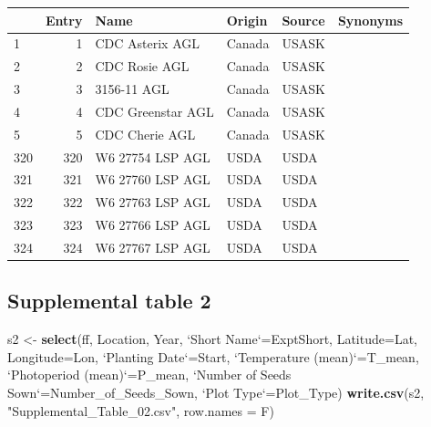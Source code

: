 \documentclass[
]{article}
\newenvironment{Shaded}{\begin{snugshade}}{\end{snugshade}}
\newcommand{\DataTypeTok}[1]{\textcolor[rgb]{0.13,0.29,0.53}{#1}}
\newcommand{\KeywordTok}[1]{\textcolor[rgb]{0.13,0.29,0.53}{\textbf{#1}}}
\newcommand{\NormalTok}[1]{#1}
\newcommand{\StringTok}[1]{\textcolor[rgb]{0.31,0.60,0.02}{#1}}
\begin{document}
\begin{longtable}[]{@{}lrllll@{}}
\toprule
& Entry & Name & Origin & Source & Synonyms\tabularnewline
\midrule
\endhead
1 & 1 & CDC Asterix AGL & Canada & USASK &\tabularnewline
2 & 2 & CDC Rosie AGL & Canada & USASK &\tabularnewline
3 & 3 & 3156-11 AGL & Canada & USASK &\tabularnewline
4 & 4 & CDC Greenstar AGL & Canada & USASK &\tabularnewline
5 & 5 & CDC Cherie AGL & Canada & USASK &\tabularnewline
320 & 320 & W6 27754 LSP AGL & USDA & USDA &\tabularnewline
321 & 321 & W6 27760 LSP AGL & USDA & USDA &\tabularnewline
322 & 322 & W6 27763 LSP AGL & USDA & USDA &\tabularnewline
323 & 323 & W6 27766 LSP AGL & USDA & USDA &\tabularnewline
324 & 324 & W6 27767 LSP AGL & USDA & USDA &\tabularnewline
\bottomrule
\end{longtable}

\hypertarget{supplemental-table-2}{%
\subsection{Supplemental table 2}\label{supplemental-table-2}}

\begin{Shaded}
\begin{Highlighting}[]
\NormalTok{s2 <-}\StringTok{ }\KeywordTok{select}\NormalTok{(ff, Location, Year, }\StringTok{`}\DataTypeTok{Short Name}\StringTok{`}\NormalTok{=ExptShort, }\DataTypeTok{Latitude=}\NormalTok{Lat, }\DataTypeTok{Longitude=}\NormalTok{Lon,}
  \StringTok{`}\DataTypeTok{Planting Date}\StringTok{`}\NormalTok{=Start, }\StringTok{`}\DataTypeTok{Temperature (mean)}\StringTok{`}\NormalTok{=T_mean, }\StringTok{`}\DataTypeTok{Photoperiod (mean)}\StringTok{`}\NormalTok{=P_mean, }
  \StringTok{`}\DataTypeTok{Number of Seeds Sown}\StringTok{`}\NormalTok{=Number_of_Seeds_Sown, }\StringTok{`}\DataTypeTok{Plot Type}\StringTok{`}\NormalTok{=Plot_Type)}
\KeywordTok{write.csv}\NormalTok{(s2, }\StringTok{"Supplemental_Table_02.csv"}\NormalTok{, }\DataTypeTok{row.names =}\NormalTok{ F)}
\end{Highlighting}
\end{Shaded}
\end{document}
